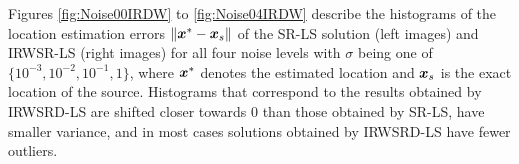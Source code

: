 Figures \ref{fig:Noise00IRDW} to \ref{fig:Noise04IRDW} describe the histograms of the location estimation errors $\|\mbox{\boldmath$x$}^* - \mbox{\boldmath$x$}_s\|$ of the SR-LS solution (left images) and IRWSR-LS (right images) for all four noise levels with $\sigma$ being one of $\{10^{-3}, 10^{-2}, 10^{-1}, 1\}$, where $\mbox{\boldmath$x$}^*$ denotes the estimated location and $\mbox{\boldmath$x$}_s$ is the exact location of the source. Histograms that correspond to the results obtained by IRWSRD-LS are shifted closer towards $0$ than those obtained by SR-LS, have smaller variance, and in most cases solutions obtained by IRWSRD-LS have fewer outliers.




\newpage

